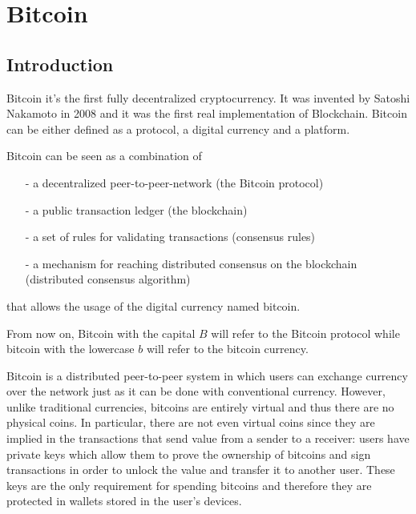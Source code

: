 \section{Bitcoin}\label{sec:Bitcoin}
\subsection{Introduction}

Bitcoin it's the first fully decentralized cryptocurrency. It was invented by
Satoshi Nakamoto in 2008 and it was the first real implementation of Blockchain.
Bitcoin can be either defined as a protocol, a digital currency and a platform.

Bitcoin can be seen as a combination of
\vspace{-\topsep}
\begin{itemize}
  \item[-] a decentralized peer-to-peer-network (the Bitcoin protocol)
  \item[-] a public transaction ledger (the blockchain)
  \item[-] a set of rules for validating transactions (consensus rules)
  \item[-] a mechanism for reaching distributed consensus on the blockchain (distributed
  consensus algorithm)
\end{itemize}
\vspace{-\topsep}
that allows the usage of the digital currency named bitcoin.

From now on, Bitcoin with the capital $B$ will refer to the Bitcoin protocol
while bitcoin with the lowercase $b$ will refer to the bitcoin currency.



Bitcoin is a distributed peer-to-peer system in which users can exchange
currency over the network just as it can be done with conventional currency.
However, unlike traditional currencies, bitcoins are entirely virtual and thus
there are no physical coins. In particular, there are not even virtual coins since
they are implied in the transactions that send value from a sender to a receiver:
users have private keys which allow them to prove the ownership of bitcoins and
sign transactions in order to unlock the value and transfer it to another user.
These keys are the only requirement for spending bitcoins and therefore they are
protected in wallets stored in the user's devices.

